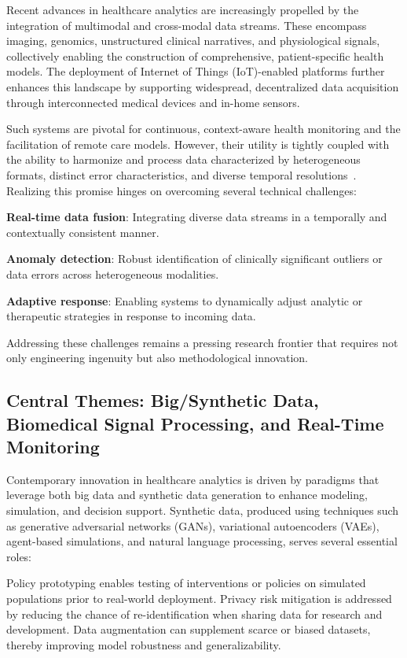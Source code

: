 \documentclass[sigconf]{acmart}
\begin{document}
Recent advances in healthcare analytics are increasingly propelled by the integration of multimodal and cross-modal data streams. These encompass imaging, genomics, unstructured clinical narratives, and physiological signals, collectively enabling the construction of comprehensive, patient-specific health models. The deployment of Internet of Things (IoT)-enabled platforms further enhances this landscape by supporting widespread, decentralized data acquisition through interconnected medical devices and in-home sensors.

Such systems are pivotal for continuous, context-aware health monitoring and the facilitation of remote care models. However, their utility is tightly coupled with the ability to harmonize and process data characterized by heterogeneous formats, distinct error characteristics, and diverse temporal resolutions~\cite{ref91,ref92,ref106}. Realizing this promise hinges on overcoming several technical challenges:

\textbf{Real-time data fusion}: Integrating diverse data streams in a temporally and contextually consistent manner.

\textbf{Anomaly detection}: Robust identification of clinically significant outliers or data errors across heterogeneous modalities.

\textbf{Adaptive response}: Enabling systems to dynamically adjust analytic or therapeutic strategies in response to incoming data.

Addressing these challenges remains a pressing research frontier that requires not only engineering ingenuity but also methodological innovation.

\subsection{Central Themes: Big/Synthetic Data, Biomedical Signal Processing, and Real-Time Monitoring}

Contemporary innovation in healthcare analytics is driven by paradigms that leverage both big data and synthetic data generation to enhance modeling, simulation, and decision support. Synthetic data, produced using techniques such as generative adversarial networks (GANs), variational autoencoders (VAEs), agent-based simulations, and natural language processing, serves several essential roles:

Policy prototyping enables testing of interventions or policies on simulated populations prior to real-world deployment. Privacy risk mitigation is addressed by reducing the chance of re-identification when sharing data for research and development. Data augmentation can supplement scarce or biased datasets, thereby improving model robustness and generalizability.
\end{document}
